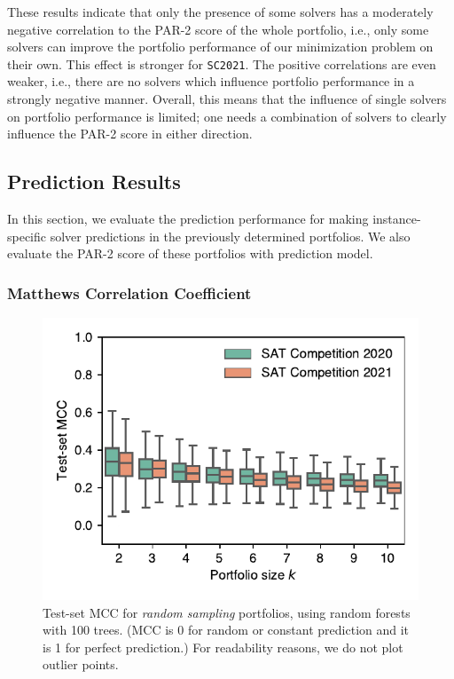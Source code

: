 \documentclass[conference]{IEEEtran}
\begin{document}
These results indicate that only the presence of some solvers has a moderately negative correlation to the PAR-2 score of the whole portfolio, i.e., only some solvers can improve the portfolio performance of our minimization problem on their own.
This effect is stronger for \texttt{SC2021}.
The positive correlations are even weaker, i.e., there are no solvers which influence portfolio performance in a strongly negative manner.
Overall, this means that the influence of single solvers on portfolio performance is limited; one needs a combination of solvers to clearly influence the PAR-2 score in either direction.

\subsection{Prediction Results}

In this section, we evaluate the prediction performance for making instance-specific solver predictions in the previously determined portfolios. 
We also evaluate the PAR-2 score of these portfolios with prediction model. 

\subsubsection{Matthews Correlation Coefficient}

\begin{figure}[t]
	\centering
	\includegraphics[width=\columnwidth]{plots/prediction-test-mcc.pdf}
	\caption{
		Test-set MCC for \emph{random sampling} portfolios, using random forests with 100 trees.
		(MCC is 0 for random or constant prediction and it is 1 for perfect prediction.)
		For readability reasons, we do not plot outlier points.
	}
	\label{fig:prediction-test-mcc}
\end{figure}
\end{document}
